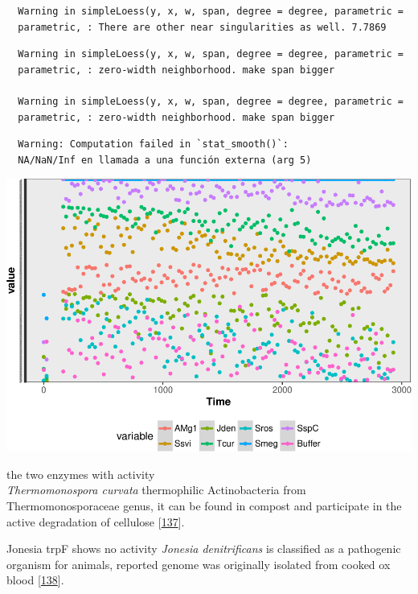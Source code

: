 \documentclass[12pt,twoside]{reedthesis}
\begin{document}
  \begin{verbatim}
  Warning in simpleLoess(y, x, w, span, degree = degree, parametric =
  parametric, : There are other near singularities as well. 7.7869
  \end{verbatim}
  
  \begin{verbatim}
  Warning in simpleLoess(y, x, w, span, degree = degree, parametric =
  parametric, : zero-width neighborhood. make span bigger
  
  Warning in simpleLoess(y, x, w, span, degree = degree, parametric =
  parametric, : zero-width neighborhood. make span bigger
  \end{verbatim}
  
  \begin{verbatim}
  Warning: Computation failed in `stat_smooth()`:
  NA/NaN/Inf en llamada a una función externa (arg 5)
  \end{verbatim}
  
  \begin{center}\includegraphics{tesis_files/figure-latex/activity-4} \end{center}
  
  the two enzymes with activity\\
  \emph{Thermomonospora curvata} thermophilic Actinobacteria from
  Thermomonosporaceae genus, it can be found in compost and participate in
  the active degradation of cellulose
  {[}\protect\hyperlink{ref-chertkov_complete_2011}{137}{]}.
  
  Jonesia trpF shows no activity \emph{Jonesia denitrificans} is
  classified as a pathogenic organism for animals, reported genome was
  originally isolated from cooked ox blood
  {[}\protect\hyperlink{ref-pukall_complete_2009}{138}{]}.
  
\end{document}
